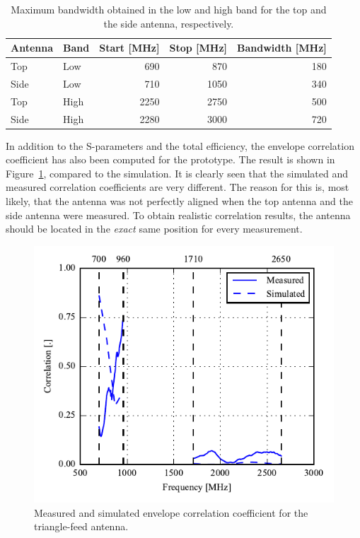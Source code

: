    \begin{table}
      \centering
      \begin{tabular}{|l|l|r|r|r|}
        \hline
        Antenna & Band & Start [MHz] & Stop [MHz] & Bandwidth [MHz] \\
        \hline
        Top     & Low  & 690        & 870       & 180 \\
        Side    & Low  & 710         & 1050        & 340 \\
        \hline
        Top     & High & 2250        & 2750       & 500 \\
        Side    & High & 2280        & 3000       & 720 \\
        \hline
      \end{tabular}
      \caption{Maximum bandwidth obtained in the low and high band for the top and the side antenna, respectively.}
      \label{tab:bw_sol2_proto}
    \end{table}

In addition to the S-parameters and the total efficiency, the envelope correlation coefficient has also been computed for the prototype. The result is shown in Figure~\ref{fig:triang_proto_ecc}, compared to the simulation. It is clearly seen that the simulated and measured correlation coefficients are very different. The reason for this is, most likely, that the antenna was not perfectly aligned when the top antenna and the side antenna were measured. To obtain realistic correlation results, the antenna should be located in the \emph{exact} same position for every measurement.

\begin{figure}[htbp]
    \centering
    \includegraphics{img/tech_sol/trianglefeed/mockup/best_correlation.pdf}
    \caption{Measured and simulated envelope correlation coefficient for the triangle-feed antenna.}
    \label{fig:triang_proto_ecc}
\end{figure}

